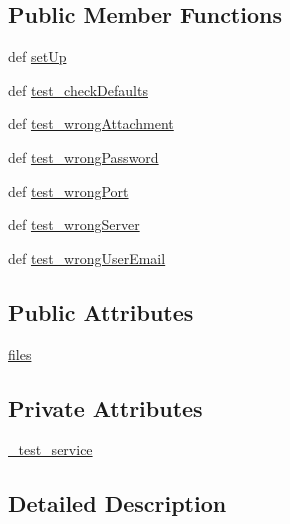 \subsection*{Public Member Functions}
\begin{DoxyCompactItemize}
\item 
def \hyperlink{classemail__sender__unit__tests_1_1TestEmailSender_adbb56cb29e2ba8760f11b493e9482be1}{set\-Up}
\item 
def \hyperlink{classemail__sender__unit__tests_1_1TestEmailSender_addc81811467a8a1e7a7b402842409542}{test\-\_\-check\-Defaults}
\item 
def \hyperlink{classemail__sender__unit__tests_1_1TestEmailSender_a9864b19987af3aac565a0fc5d5b40373}{test\-\_\-wrong\-Attachment}
\item 
def \hyperlink{classemail__sender__unit__tests_1_1TestEmailSender_a9e2d09e797451e7994f89d2abbfdccb0}{test\-\_\-wrong\-Password}
\item 
def \hyperlink{classemail__sender__unit__tests_1_1TestEmailSender_a4a3997ede34edc3d19e227741b264c4b}{test\-\_\-wrong\-Port}
\item 
def \hyperlink{classemail__sender__unit__tests_1_1TestEmailSender_a3f8940acc8bb60128ee8a46eb86a9378}{test\-\_\-wrong\-Server}
\item 
def \hyperlink{classemail__sender__unit__tests_1_1TestEmailSender_a1590cd595e9647aa2e346cac4918c6b0}{test\-\_\-wrong\-User\-Email}
\end{DoxyCompactItemize}
\subsection*{Public Attributes}
\begin{DoxyCompactItemize}
\item 
\hyperlink{classemail__sender__unit__tests_1_1TestEmailSender_a6ce5ce0d7c4e0f9bb0a2e8b477a64cb4}{files}
\end{DoxyCompactItemize}
\subsection*{Private Attributes}
\begin{DoxyCompactItemize}
\item 
\hyperlink{classemail__sender__unit__tests_1_1TestEmailSender_a04b8fc172c807fc34874e1c2ae53882e}{\-\_\-test\-\_\-service}
\end{DoxyCompactItemize}


\subsection{Detailed Description}


